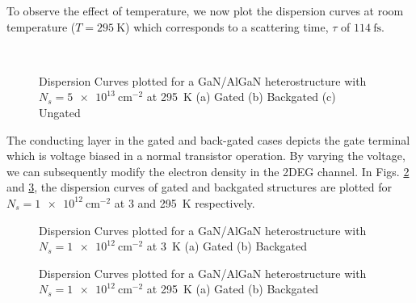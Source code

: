 \documentclass[12pt]{article}
\begin{document}
To observe the effect of temperature, we now plot the dispersion curves at room temperature ($T = \SI{295}{\kelvin}$) which corresponds to a scattering time, $\tau$ of $\SI{114}{\fs}$.
\begin{figure}[!htbp]
  \centering
   \\
  \caption{Dispersion Curves plotted for a GaN/AlGaN heterostructure with $N_s = \SI{5e13}{\cm^{-2}}$ at \SI{295}{\kelvin} (a) Gated (b) Backgated (c) Ungated}
  \label{fig:dispersion_hif_hiT}
\end{figure}
%

The conducting layer in the gated and back-gated cases depicts the gate terminal which is voltage biased in a normal transistor operation. By varying the voltage, we can subsequently modify the electron density in the 2DEG channel. In Figs. \ref{fig:dispersion_lof_lowT} and \ref{fig:dispersion_lof_hiT}, the dispersion curves of gated and backgated structures are plotted for $N_s = \SI{1e12}{\cm^{-2}}$ at \SI{3}{} and \SI{295}{\kelvin} respectively.
\begin{figure}[!htbp]
  \begin{center}
      \hfil
  \caption{Dispersion Curves plotted for a GaN/AlGaN heterostructure with $N_s = \SI{1e12}{\cm^{-2}}$ at \SI{3}{\kelvin} (a) Gated (b) Backgated}
  \label{fig:dispersion_lof_lowT}
  \end{center}
\end{figure}
%

\begin{figure}[!htbp]
  \begin{center}
      \hfil
  \caption{Dispersion Curves plotted for a GaN/AlGaN heterostructure with $N_s = \SI{1e12}{\cm^{-2}}$ at \SI{295}{\kelvin} (a) Gated (b) Backgated}
  \label{fig:dispersion_lof_hiT}
  \end{center}
\end{figure}
\end{document}
